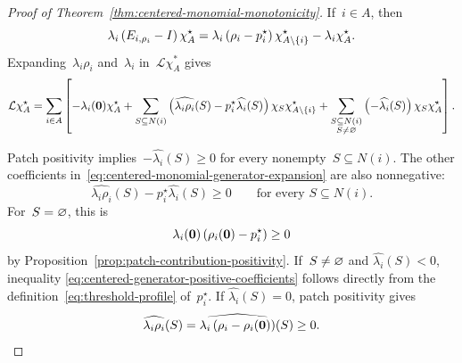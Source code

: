 \documentclass[EJP,preprint,NODS,nobera]{ejpecp}
\begin{document}
\begin{proof}[Proof of Theorem~\ref{thm:centered-monomial-monotonicity}]
If~$i\in A$, then
\begin{equation*}
\lambda_i\left(E_{i,\rho_i}-I\right)\chi_A^\star
=
\lambda_i\left(\rho_i-p_i^\star\right)\chi_{A\setminus\left\{i\right\}}^\star
-
\lambda_i\chi_A^\star.
\end{equation*}
Expanding~$\lambda_i\rho_i$ and~$\lambda_i$ in~$\mathcal{L}\chi_A^*$ gives
\begin{equation}
\label{eq:centered-monomial-generator-expansion}
\mathcal{L}\chi_A^\star
=
\sum_{i\in A}\left[
-\lambda_i(\mathbf{0})\chi_A^\star
+
\sum_{S\subseteq N(i)}
\left(
\widehat{\lambda_i\rho_i}(S)
-
p_i^\star\widehat{\lambda_i}(S)
\right)
\chi_S\chi_{A\setminus\left\{i\right\}}^\star
+
\sum_{\substack{S\subseteq N(i)\\S\neq\varnothing}}
\left(-\widehat{\lambda_i}(S)\right)
\chi_S\chi_A^\star
\right].
\end{equation}

Patch positivity implies~$-\widehat{\lambda_i}(S)\geq0$ for every nonempty~$S\subseteq N(i)$.
The other coefficients in~\eqref{eq:centered-monomial-generator-expansion}
are also nonnegative:
\begin{equation}
\label{eq:centered-generator-positive-coefficients}
\widehat{\lambda_i\rho_i}(S)
-
p_i^\star\widehat{\lambda_i}(S)
\geq0
\qquad
\text{for every }S\subseteq N(i).
\end{equation}
For~$S=\varnothing$, this is
\begin{equation*}
\lambda_i(\mathbf{0})
\left(\rho_i(\mathbf{0})-p_i^\star\right)
\geq0
\end{equation*}
by Proposition~\ref{prop:patch-contribution-positivity}. If~$S\neq\varnothing$ and
$\widehat{\lambda_i}(S)<0$, inequality
\eqref{eq:centered-generator-positive-coefficients} follows directly from the
definition~\eqref{eq:threshold-profile} of~$p_i^\star$. If
$\widehat{\lambda_i}(S)=0$, patch positivity gives
\begin{equation*}
\widehat{\lambda_i\rho_i}(S)
=
\widehat{\lambda_i\left(\rho_i-\rho_i(\mathbf{0})\right)}(S)
\geq0.
\end{equation*}


\end{proof}
\end{document}
